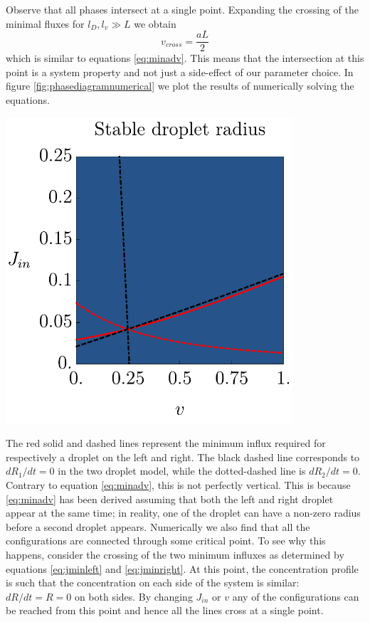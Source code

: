 \documentclass{Dissertate}
\let\origfigure\figure
\let\endorigfigure\endfigure
\renewenvironment{figure}[1][2] {
    \expandafter\origfigure\expandafter[H]
} {
    \endorigfigure
}
\begin{document}
Observe that all phases intersect at a single point. Expanding the crossing
of the minimal fluxes for \(l_D,l_v\gg L\) we obtain \[
v_{cross}=\frac{aL}{2}
\] which is similar to equations \ref{eq:minadv}. This means that the
intersection at this point is a system property and not just a
side-effect of our parameter choice. In figure
\ref{fig:phasediagramnumerical} we plot the results of numerically
solving the equations.

\begin{figure}
\hypertarget{fig:phasediagramnumerical}{%
\centering
\includegraphics[width=0.8\textwidth]{source/figures/pdf/Numericalphase.pdf}
\caption{Numerically determined phase diagram of the droplets in the system. The red solid and dashed lines represent the minimum influx required for
respectively a droplet on the left and right. The black dashed line
corresponds to \(dR_1/dt=0\) in the two droplet model, while the
dotted-dashed line is \(dR_2/dt=0\).}
\label{fig:phasediagramnumerical}
}
\end{figure}

The red solid and dashed lines represent the minimum influx required for
respectively a droplet on the left and right. The black dashed line
corresponds to \(dR_1/dt=0\) in the two droplet model, while the
dotted-dashed line is \(dR_2/dt=0\). Contrary to equation \ref{eq:minadv}, this is not perfectly vertical. This is because \ref{eq:minadv} has been derived assuming that both the left and
right droplet appear at the same time; in reality, one of the droplet
can have a non-zero radius before a second droplet appears. Numerically
we also find that all the configurations are connected through some critical
point. To see why this happens, consider the crossing of the two minimum influxes as determined by equations \ref{eq:jminleft} and \ref{eq:jminright}. At this point, the concentration profile is such that the concentration on each side of the system is similar: \(dR/dt=R=0\) on
both sides. By changing \(J_{in}\) or \(v\) any of the configurations can be
reached from this point and hence all the lines cross at a single point.
\end{document}

